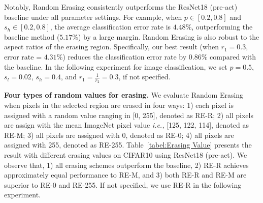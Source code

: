 \documentclass[10pt,twocolumn,letterpaper]{article}
\begin{document}
Notably, Random Erasing consistently outperforms the ResNet18 (pre-act) baseline under all parameter settings. For example, when $p \in [0.2, 0.8]$ and $s_h \in [0.2, 0.8]$, the average classification error rate is $4.48 \%$, outperforming the baseline method ($5.17 \%$) by a large margin. Random Erasing is also robust to the aspect ratios of the erasing region. Specifically, our best result (when $r_1=0.3$, error rate = $4.31 \%$) reduces the classification error rate by 0.86\% compared with the baseline. %
In the following experiment for image classification, we set $p = 0.5$, $s_l = 0.02$, $s_h = 0.4$, and $r_1 = \frac{1}{r_2} = 0.3$, if not specified.



\textbf{Four types of random values for erasing.} 
We evaluate Random Erasing when pixels in the selected region are erased in four ways: 1) each pixel is assigned with a random value ranging in [0, 255], denoted as RE-R; 2) all pixels are assign with the mean ImageNet pixel value \emph{i.e.,} [125, 122, 114], denoted as RE-M; 3) all pixels are assigned with 0, denoted as RE-0; 4) all pixels are assigned with 255, denoted as RE-255. Table~\ref{tabel:Erasing Value} presents the result with different erasing values on CIFAR10 using ResNet18 (pre-act). We observe that, 1) all erasing schemes outperform the baseline, 2) RE-R achieves approximately equal performance to RE-M, and 3) both RE-R and RE-M are superior to RE-0 and RE-255. If not specified, we use RE-R in the following experiment.
\end{document}
